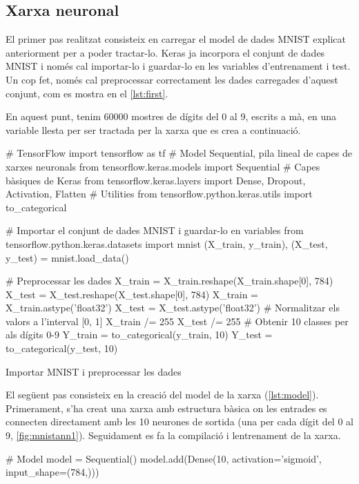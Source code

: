\begin{refsection}
	\section{Xarxa neuronal}
	
	El primer pas realitzat consisteix en carregar el model de dades MNIST explicat anteriorment per a poder tractar-lo. Keras ja incorpora el conjunt de dades MNIST i només cal importar-lo i guardar-lo en les variables d'entrenament i test. Un cop fet, només cal preprocessar correctament les dades carregades d'aquest conjunt, com es mostra en el \cref{lst:first}.
	
	En aquest punt, tenim 60000 mostres de dígits del 0 al 9, escrits a mà, en una variable llesta per ser tractada per la xarxa que es crea a continuació.
	
	\begin{listing}[H]
		\begin{pythoncode}
# TensorFlow
import tensorflow as tf
# Model Sequential, pila lineal de capes de xarxes neuronals
from tensorflow.keras.models import Sequential
# Capes bàsiques de Keras
from tensorflow.keras.layers import Dense, Dropout, Activation, Flatten
# Utilities
from tensorflow.python.keras.utils import to_categorical

# Importar el conjunt de dades MNIST i guardar-lo en variables
from tensorflow.python.keras.datasets import mnist
(X_train, y_train), (X_test, y_test) = mnist.load_data()

# Preprocessar les dades
X_train = X_train.reshape(X_train.shape[0], 784)
X_test = X_test.reshape(X_test.shape[0], 784)
X_train = X_train.astype('float32')
X_test = X_test.astype('float32')
# Normalitzar els valors a l'interval [0, 1]
X_train /= 255
X_test /= 255
# Obtenir 10 classes per als dígits 0-9
Y_train = to_categorical(y_train, 10)
Y_test = to_categorical(y_test, 10)
\end{pythoncode}
		\caption{Importar MNIST i preprocessar les dades}
		\label{lst:first}
	\end{listing}

	El següent pas consisteix en la creació del model de la xarxa (\cref{lst:model}). Primerament, s’ha creat una xarxa amb estructura bàsica on les entrades es connecten directament amb les 10 neurones de sortida (una per cada dígit del 0 al 9, \cref{fig:mnistann1}). Seguidament es fa la compilació i lentrenament de la xarxa.

	\begin{listing}[H]
		\begin{pythoncode}
# Model
model = Sequential()
model.add(Dense(10, activation='sigmoid', input_shape=(784,)))


\end{pythoncode}
\end{listing}
\end{refsection}
